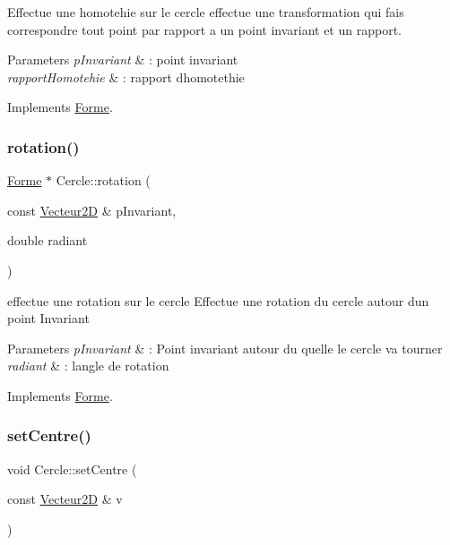 Effectue une homotehie sur le cercle effectue une transformation qui fais correspondre tout point par rapport a un point invariant et un rapport. 


\begin{DoxyParams}{Parameters}
{\em p\+Invariant} & \+: point invariant \\
\hline
{\em rapport\+Homotehie} & \+: rapport d\textquotesingle{}homotethie \\
\hline
\end{DoxyParams}


Implements \mbox{\hyperlink{class_forme}{Forme}}.

\mbox{\label{class_cercle_af9e9abb354ac250e94d42dd46ef6eafa}} 
\subsubsection{\texorpdfstring{rotation()}{rotation()}}
{\footnotesize\ttfamily \mbox{\hyperlink{class_forme}{Forme}} $\ast$ Cercle\+::rotation (\begin{DoxyParamCaption}\item[{const \mbox{\hyperlink{class_vecteur2_d}{Vecteur2D}} \&}]{p\+Invariant,  }\item[{double}]{radiant }\end{DoxyParamCaption})\hspace{0.3cm}{\ttfamily [virtual]}}



effectue une rotation sur le cercle Effectue une rotation du cercle autour d\textquotesingle{}un point Invariant 


\begin{DoxyParams}{Parameters}
{\em p\+Invariant} & \+: Point invariant autour du quelle le cercle va tourner \\
\hline
{\em radiant} & \+: l\textquotesingle{}angle de rotation \\
\hline
\end{DoxyParams}


Implements \mbox{\hyperlink{class_forme}{Forme}}.

\mbox{\label{class_cercle_aa445da0cb6b4aa420b4b6e128a432f41}} 
\subsubsection{\texorpdfstring{setCentre()}{setCentre()}}
{\footnotesize\ttfamily void Cercle\+::set\+Centre (\begin{DoxyParamCaption}\item[{const \mbox{\hyperlink{class_vecteur2_d}{Vecteur2D}} \&}]{v }\end{DoxyParamCaption})\hspace{0.3cm}{\ttfamily [inline]}}



